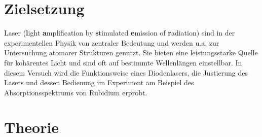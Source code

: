 \section{Zielsetzung}
Laser (\textbf{l}ight \textbf{a}mplification by \textbf{s}timulated \textbf{e}mission of \textbf{r}adiation) sind in der experimentellen Physik von zentraler Bedeutung
und werden u.a. zur Untersuchung atomarer Strukturen genutzt. Sie bieten eine leistungsstarke Quelle für kohärentes Licht und sind 
oft auf bestimmte Wellenlängen einstellbar. In diesem Versuch wird die Funktionsweise eines Diodenlasers, die Justierung des Lasers
und dessen Bedienung im Experiment am Beispiel des Absorptionsspektrums von Rubidium erprobt.


\section{Theorie}
\label{sec:Theorie}


